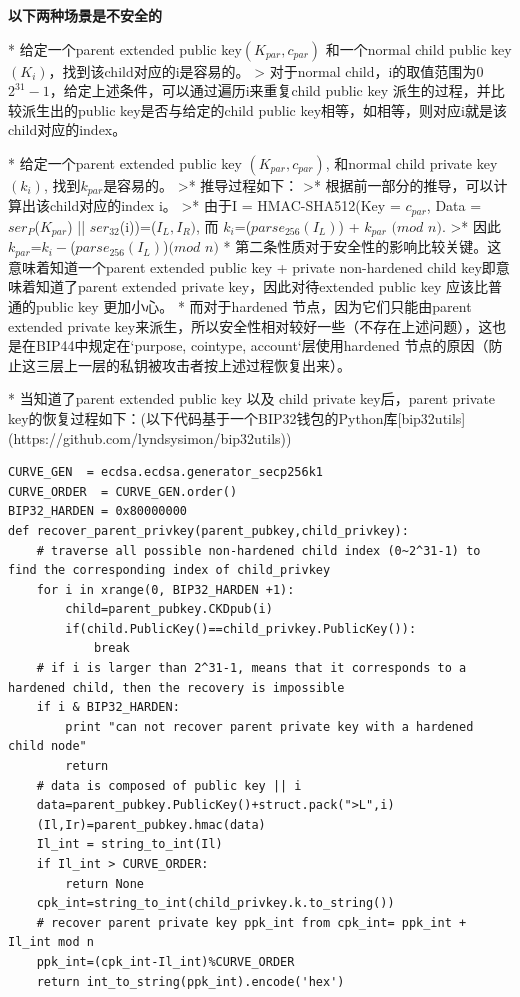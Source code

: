 \textbf{以下两种场景是不安全的}

* 给定一个parent extended public key$(K_{par},c_{par})$ 和一个normal child public key $(K_i)$，找到该child对应的i是容易的。
> 对于normal child，i的取值范围为$0$~$2^{31}-1$，给定上述条件，可以通过遍历i来重复child public key 派生的过程，并比较派生出的public key是否与给定的child public key相等，如相等，则对应i就是该child对应的index。

* 给定一个parent extended public key $(K_{par},c_{par})$, 和normal child private key $(k_i)$, 找到$k_{par}$是容易的。
>* 推导过程如下：
>* 根据前一部分的推导，可以计算出该child对应的index i。  
>* 由于I = HMAC-SHA512(Key = $c_{par}$, Data = $ser_P$($K_{par}$) || $ser_{32}$(i))=($I_L,I_R)$, 而 $k_i$=($parse_{256}(I_L)$) + $k_{par}$ $(mod$ $n)$.   
>* 因此 $k_{par}$=$k_i-$($parse_{256}(I_L)$)$(mod$ $n)$    
* 第二条性质对于安全性的影响比较关键。这意味着知道一个parent extended public key + private non-hardened child key即意味着知道了parent extended private key，因此对待extended public key 应该比普通的public key 更加小心。
* 而对于hardened 节点，因为它们只能由parent extended private key来派生，所以安全性相对较好一些（不存在上述问题），这也是在BIP44中规定在`purpose, cointype, account`层使用hardened 节点的原因（防止这三层上一层的私钥被攻击者按上述过程恢复出来）。

* 当知道了parent extended public key 以及 child private key后，parent private key的恢复过程如下：(以下代码基于一个BIP32钱包的Python库[bip32utils](https://github.com/lyndsysimon/bip32utils))

\begin{lstlisting}
CURVE_GEN  = ecdsa.ecdsa.generator_secp256k1
CURVE_ORDER  = CURVE_GEN.order()
BIP32_HARDEN = 0x80000000 
def recover_parent_privkey(parent_pubkey,child_privkey):
	# traverse all possible non-hardened child index (0~2^31-1) to find the corresponding index of child_privkey
	for i in xrange(0, BIP32_HARDEN +1):
		child=parent_pubkey.CKDpub(i)
		if(child.PublicKey()==child_privkey.PublicKey()):
			break
    # if i is larger than 2^31-1, means that it corresponds to a hardened child, then the recovery is impossible
	if i & BIP32_HARDEN:
		print "can not recover parent private key with a hardened child node"
		return
	# data is composed of public key || i
	data=parent_pubkey.PublicKey()+struct.pack(">L",i)
	(Il,Ir)=parent_pubkey.hmac(data)
	Il_int = string_to_int(Il)
	if Il_int > CURVE_ORDER:
	    return None
	cpk_int=string_to_int(child_privkey.k.to_string())
	# recover parent private key ppk_int from cpk_int= ppk_int + Il_int mod n
	ppk_int=(cpk_int-Il_int)%CURVE_ORDER
	return int_to_string(ppk_int).encode('hex')
\end{lstlisting}

